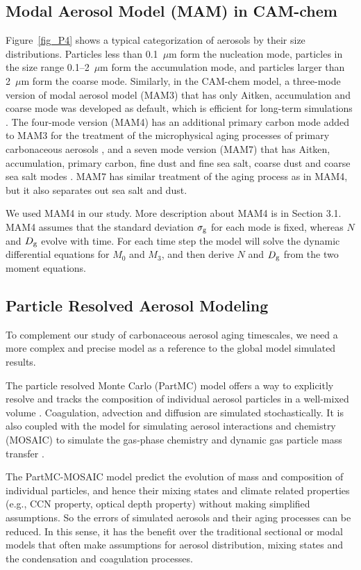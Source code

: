 \documentclass[12pt, fullpage]{uiucthesis2009_2}
\begin{document}
		\subsection{Modal Aerosol Model (MAM) in CAM-chem}
		Figure~\ref{fig_P4} shows a typical categorization of aerosols by their size distributions. Particles less than 0.1~$\mu$m form the nucleation mode, particles in the size range 0.1--2~$\mu$m form the accumulation mode, and particles larger than 2~$\mu$m form the coarse mode. Similarly, in the CAM-chem model, a three-mode version of modal aerosol model (MAM3) that has only Aitken, accumulation and coarse mode was developed as default, which is efficient for long-term simulations \citep{Liu2012}. The four-mode version (MAM4) has an additional primary carbon mode added to MAM3 for the treatment of the microphysical aging processes of primary carbonaceous aerosols \citep{Liu2016}, and a seven mode version (MAM7) that has Aitken, accumulation, primary carbon, fine dust and fine sea salt, coarse dust and coarse sea salt modes \citep{Liu2012}. MAM7 has similar treatment of the aging process as in MAM4, but it also separates out sea salt and dust.
		
		We used MAM4 in our study. More description about MAM4 is in Section 3.1. MAM4 assumes that the standard deviation $\sigma_{\rm g}$ for each mode is fixed, whereas $N$ and $D_{\rm g}$ evolve with time. For each time step the model will solve the dynamic differential equations for $M_0$ and $M_3$, and then derive $N$ and $D_{\rm g}$ from the two moment equations.
		
		\subsection{Particle Resolved Aerosol Modeling}
		To complement our study of carbonaceous aerosol aging timescales, we need a more complex and precise model as a reference to the global model simulated results. 
		
		The particle resolved Monte Carlo (PartMC) model offers a way to explicitly resolve and tracks the composition of individual aerosol particles in a well-mixed volume \citep{riemer2009simulating}. Coagulation, advection and diffusion are simulated stochastically. It is also coupled with the model for simulating aerosol interactions and chemistry (MOSAIC) to simulate the gas-phase chemistry and dynamic gas particle mass transfer \citep{zaveri2008model}. 
		
		The PartMC-MOSAIC model predict the evolution of mass and composition of individual particles, and hence their mixing states and climate related properties (e.g., CCN property, optical depth property) without making simplified assumptions. So the errors of simulated aerosols and their aging processes can be reduced. In this sense, it has the benefit over the traditional sectional or modal models that often make assumptions for aerosol distribution, mixing states and the condensation and coagulation processes.
		
\end{document}
